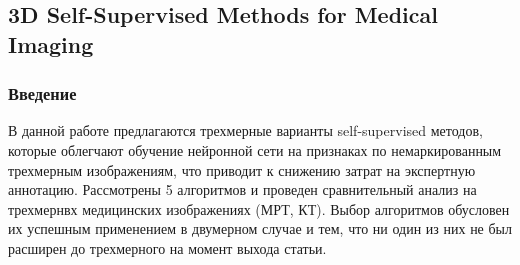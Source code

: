 \subsection*{3D Self-Supervised Methods for Medical Imaging}

\subsubsection*{Введение}
В данной работе \cite{3DSelfSuper} предлагаются трехмерные варианты self-supervised 
методов, которые облегчают обучение нейронной сети на признаках 
по немаркированным трехмерным изображениям, что приводит к снижению
затрат на экспертную аннотацию. Рассмотрены 5 алгоритмов и проведен 
сравнительный анализ на трехмернвх медицинских изображениях (МРТ, КТ).
Выбор алгоритмов обусловен их успешным применением в двумерном случае и тем,
что ни один из них не был расширен до трехмерного на момент выхода статьи.

